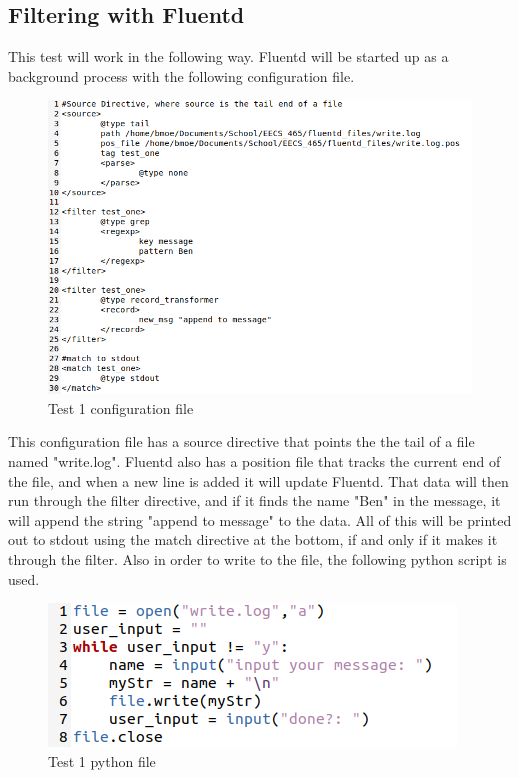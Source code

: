 \subsection{Filtering with Fluentd}
\quad \quad This test will work in the following way. Fluentd will be started up as a background process with the following configuration file.
\begin{figure}[H]
    \centering
    \includegraphics[scale=0.6]{images/t1_1.png}
    \caption{Test 1 configuration file}
    \label{fig:pic3}
\end{figure}
This configuration file has a source directive that points the the tail of a file named "write.log". Fluentd also has a position file that tracks the current end of the file, and when a new line is added it will update Fluentd.
That data will then run through the filter directive, and if it finds the name "Ben" in the message, it will append the string "append to message" to the data. All of this will be printed out to stdout using 
the match directive at the bottom, if and only if it makes it through the filter. Also in order to write to the file, the following python script is used.
\begin{figure}[H]
    \centering
    \includegraphics[scale=1]{images/t1_2.png}
    \caption{Test 1 python file}
    \label{fig:pic4}
\end{figure}
